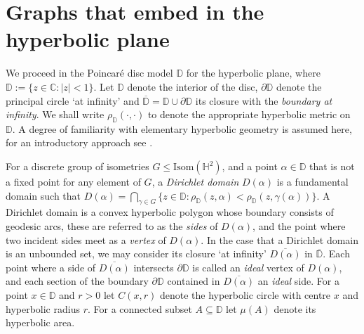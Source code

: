 \documentclass{article}
\numberwithin{equation}{section}
\newcommand{\CC}{\mathbb{C}}
\newcommand{\HH}{\mathbb{H}}
\theoremstyle{definition}
\theoremstyle{remark}
\begin{document}
\section{Graphs that embed in the hyperbolic plane}\label{sec:Hyp}
 We proceed in the Poincaré disc model $\mathbb{D}$ for the hyperbolic plane, where $\mathbb{D}:=\{z\in\CC:|z|< 1\}$. Let $\mathbb{D}$ denote the interior of the disc, $\partial \mathbb{D}$ denote the principal circle `at infinity' and $\overline{\mathbb{D}}=\mathbb{D}\cup\partial\mathbb{D}$ its closure with the \textit{boundary at infinity}.
 We shall write $\rho_\mathbb{D}(\cdot,\cdot)$ to denote the appropriate hyperbolic metric on $\mathbb{D}$. A degree of familiarity with elementary hyperbolic geometry is assumed here, for an introductory approach see \cite{anderson2005hyperbolic}. 

For a discrete group of isometries $G\leq \text{Isom}(\HH^2)$, and a point $\alpha\in\mathbb{D}$ that is not a fixed point for any element of $G$, a \textit{Dirichlet domain} $D(\alpha)$ is a fundamental domain such that $D(\alpha)=\bigcap_{\gamma\in G}\{z\in\mathbb{D}:\rho_\mathbb{D}(z,\alpha)< \rho_\mathbb{D}(z,\gamma(\alpha))\}$. A Dirichlet domain is a convex hyperbolic polygon whose boundary consists of geodesic arcs, these are referred to as the \textit{sides} of $D(\alpha)$, and the point where two incident sides meet as a \textit{vertex} of $D(\alpha)$. 
In the case that a Dirichlet domain is an unbounded set, we may consider its closure `at infinity' $\overline{D(\alpha)}$  in $\overline{\mathbb{D}}$. 
Each point where a side of $\overline{D(\alpha)}$ intersects $\partial\mathbb{D}$ is called an \textit{ideal} vertex of $D(\alpha)$, and each section of the boundary $\partial\mathbb{D}$ contained in $\overline{D(\alpha)}$ an \textit{ideal} side.
For a point $x\in \mathbb{D}$ and $r>0$ let $C(x,r)$ denote the hyperbolic circle with centre $x$ and hyperbolic radius $r$. For a connected subset $A\subseteq{\mathbb{D}}$ let $\mu(A)$ denote its hyperbolic area.
\end{document}
